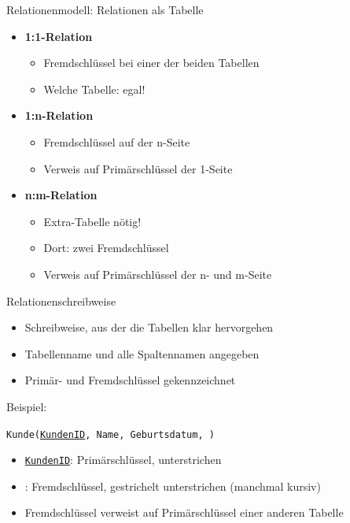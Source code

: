 \documentclass[t]{beamer}
\begin{document}
	\begin{frame}{Relationenmodell: Relationen als Tabelle}
		\begin{itemize}
			\item \textbf{1:1-Relation}
			\begin{itemize}
				\item Fremdschlüssel bei einer der beiden Tabellen
				\item Welche Tabelle: egal!
			\end{itemize}
			\item \textbf{1:n-Relation}
			\begin{itemize}
				\item Fremdschlüssel auf der n-Seite
				\item Verweis auf Primärschlüssel der 1-Seite
			\end{itemize}
			\item \textbf{n:m-Relation}
			\begin{itemize}
				\item Extra-Tabelle nötig!
				\item Dort: zwei Fremdschlüssel
				\item Verweis auf Primärschlüssel der n- und m-Seite
			\end{itemize}
		\end{itemize}
	\end{frame}
	\begin{frame}{Relationenschreibweise}
		\begin{itemize}
			\item Schreibweise, aus der die Tabellen klar hervorgehen
			\item Tabellenname und alle Spaltennamen angegeben
			\item Primär- und Fremdschlüssel gekennzeichnet
		\end{itemize}
		
		Beispiel:
		
		\texttt{Kunde(\underline{KundenID}, Name, Geburtsdatum, )}
		
		\begin{itemize}
			\item \texttt{\underline{KundenID}}: Primärschlüssel, unterstrichen
			\item \texttt{}: Fremdschlüssel, gestrichelt unterstrichen (manchmal kursiv)
			\item Fremdschlüssel verweist auf Primärschlüssel einer anderen Tabelle
		\end{itemize}
	\end{frame}
\end{document}
